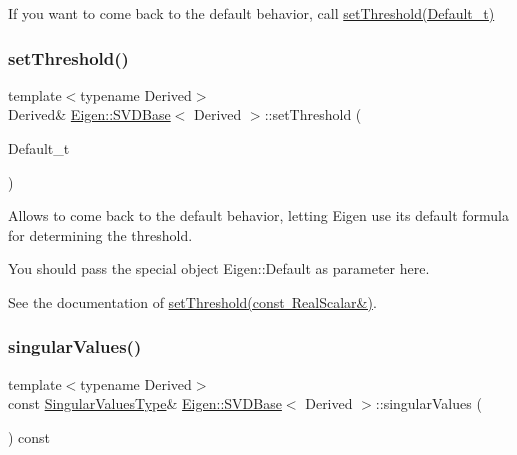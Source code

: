 If you want to come back to the default behavior, call \mbox{\hyperlink{class_eigen_1_1_s_v_d_base_a27586b69dbfb63f714d1d45fd6304f97}{set\+Threshold(\+Default\+\_\+t)}} \mbox{\label{class_eigen_1_1_s_v_d_base_a27586b69dbfb63f714d1d45fd6304f97}} 
\subsubsection{\texorpdfstring{setThreshold()}{setThreshold()}\hspace{0.1cm}{\footnotesize\ttfamily [2/2]}}
{\footnotesize\ttfamily template$<$typename Derived$>$ \\
Derived\& \mbox{\hyperlink{class_eigen_1_1_s_v_d_base}{Eigen\+::\+S\+V\+D\+Base}}$<$ Derived $>$\+::set\+Threshold (\begin{DoxyParamCaption}\item[{Default\+\_\+t}]{ }\end{DoxyParamCaption})\hspace{0.3cm}{\ttfamily [inline]}}

Allows to come back to the default behavior, letting Eigen use its default formula for determining the threshold.

You should pass the special object Eigen\+::\+Default as parameter here. 
\begin{DoxyCode}{0}
\end{DoxyCode}


See the documentation of \mbox{\hyperlink{class_eigen_1_1_s_v_d_base_a1c95d05398fc15e410a28560ef70a5a6}{set\+Threshold(const Real\+Scalar\&)}}. \mbox{\label{class_eigen_1_1_s_v_d_base_a4e7bac123570c348f7ed6be909e1e474}} 
\subsubsection{\texorpdfstring{singularValues()}{singularValues()}}
{\footnotesize\ttfamily template$<$typename Derived$>$ \\
const \mbox{\hyperlink{struct_eigen_1_1internal_1_1true__type}{Singular\+Values\+Type}}\& \mbox{\hyperlink{class_eigen_1_1_s_v_d_base}{Eigen\+::\+S\+V\+D\+Base}}$<$ Derived $>$\+::singular\+Values (\begin{DoxyParamCaption}{ }\end{DoxyParamCaption}) const\hspace{0.3cm}{\ttfamily [inline]}}

